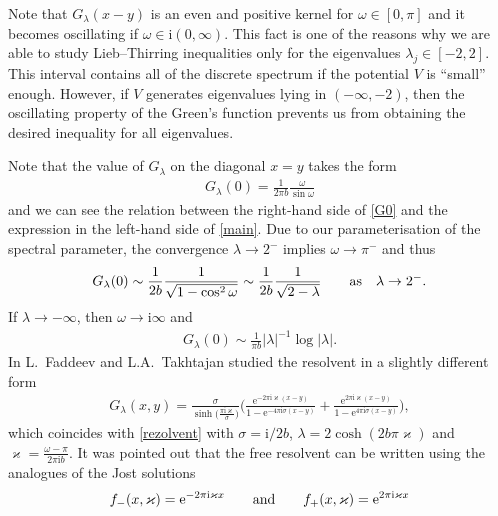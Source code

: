 \documentclass[pdftex]{sigma}%
\numberwithin{equation}{section}
\newcommand{\e}{\mathrm{e}}
\newcommand{\ii}{\mathrm{i}}
\begin{document}
\begin{Remark}
Note that $G_\lambda(x-y)$ is an even and positive kernel for $\omega\in[0,\pi]$ and it becomes oscillating if
$\omega\in \ii(0,\infty)$.
This fact is one of the reasons why we are able to study Lieb--Thirring inequalities only for the eigenvalues $\lambda_j \in [-2,2]$. This interval contains all of the discrete spectrum if the potential $V$ is ``small'' enough. However, if $V$ generates eigenvalues lying in $(-\infty,-2)$, then the oscillating property of the Green's function prevents us from obtaining the desired inequality for all eigenvalues.
\end{Remark}

Note that the value of $G_\lambda$ on the diagonal $x=y$ takes the form
\begin{gather}\label{G0}
G_\lambda(0)=\frac{1}{2\pi b}\frac{\omega}{\sin\omega}
\end{gather}
and we can see the relation between the right-hand side of \eqref{G0} and the expression in the left-hand side of \eqref{main}.
Due to our parameterisation of the spectral parameter, the convergence $\lambda\to 2^-$ implies $\omega\to \pi^-$ and thus
\begin{gather*}
G_\lambda(0) \sim \frac{1}{2b} \frac{1}{\sqrt{1-\cos^2\omega}} \sim \frac{1}{2b} \frac{1}{\sqrt{2-\lambda}}
\qquad {\rm as} \quad \lambda\to 2^-.
\end{gather*}
If $\lambda\to-\infty$, then $\omega \to \ii\infty$ and
\begin{gather*}
G_\lambda(0) \sim \frac{1}{\pi b} |\lambda|^{-1} \log |\lambda|.
\end{gather*}
In \cite{FT2} L.~Faddeev and L.A.~Takhtajan studied the resolvent in a slightly different form
\begin{gather*}
G_\lambda(x,y) = \frac{\sigma}{\sinh \big(\frac{\pi \ii \varkappa}{\sigma}\big) } \bigg( \frac{\e^{-2\pi \ii \varkappa(x-y)}}{1-\e^{- 4 \pi \ii \sigma (x-y)}} +
\frac{\e^{2\pi \ii \varkappa(x-y)}}{1-\e^{4 \pi \ii \sigma (x-y)}} \bigg),
\end{gather*}
which coincides with \eqref{rezolvent} with $\sigma = \ii/2b$, $\lambda = 2\cosh(2b\pi\varkappa)$ and $\varkappa = \frac{\omega - \pi}{2\pi \ii b}$.
It was pointed out that the free resolvent can be written using the analogues of the Jost solutions
\begin{gather*}
f_-(x,\varkappa) = \e^{-2\pi \ii \varkappa x} \qquad {\rm and} \qquad f_+(x,\varkappa) = \e^{2\pi \ii \varkappa x}
\end{gather*}
\end{document}
